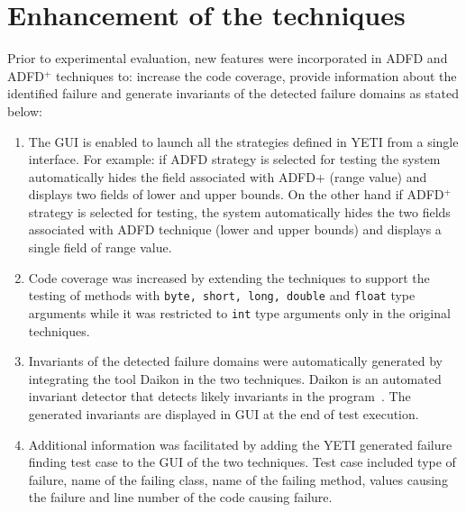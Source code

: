 \section{Enhancement of the techniques}
Prior to experimental evaluation, new features were incorporated in ADFD and ADFD$^+$ techniques to: increase the code coverage, provide information about the identified failure and generate invariants of the detected failure domains as stated below: 
\begin{enumerate}

\item The GUI is enabled to launch all the strategies defined in YETI from a single interface. For example: if ADFD strategy is selected for testing the system automatically hides the field associated with ADFD+ (range value) and displays two fields of lower and upper bounds. On the other hand if ADFD$^+$ strategy is selected for testing, the system automatically hides the two fields associated with ADFD technique (lower and upper bounds) and displays a single field of range value.

\clearpage
\newpage 

\item Code coverage was increased by extending the techniques to support the testing of methods with \verb+byte, short, long, double+ and \verb+float+ type arguments while it was restricted to \verb+int+ type arguments only in the original techniques.

\item Invariants of the detected failure domains were automatically generated by integrating the tool Daikon in the two techniques. Daikon is an automated invariant detector that detects likely invariants in the program~\cite{ernst2007daikon}. The generated invariants are displayed in GUI at the end of test execution. 

\item Additional information was facilitated by adding the YETI generated failure finding test case to the GUI of the two techniques. Test case included type of failure, name of the failing class, name of the failing method, values causing the failure and line number of the code causing failure.





\end{enumerate}
